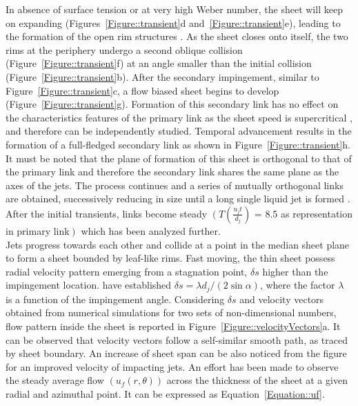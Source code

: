 \documentclass{jfm}
\begin{document}
In absence of surface tension or at very high Weber number, the sheet will keep on expanding (Figures~\ref{Figure::transient}d and~\ref{Figure::transient}e), leading to the formation of the open rim structures \citep{taylor1960formation,chen2013high}. As the sheet closes onto itself, the two rims at the periphery undergo a second oblique collision (Figure~\ref{Figure::transient}f) at an angle smaller than the initial collision (Figure~\ref{Figure::transient}b). After the secondary impingement, similar to Figure~\ref{Figure::transient}c, a flow biased sheet begins to develop (Figure~\ref{Figure::transient}g). Formation of this secondary link has no effect on the characteristics features of the primary link as the sheet speed is supercritical \citep{bush2004collision}, and therefore can be independently studied. Temporal advancement results in the formation of a full-fledged secondary link as shown in Figure~\ref{Figure::transient}h. It must be noted that the plane of formation of this sheet is orthogonal to that of the primary link and therefore the secondary link shares the same plane as the axes of the jets. The process continues and a series of mutually orthogonal links are obtained, successively reducing in size until a long single liquid jet is formed \citep{bush2004collision}. After the initial transients, links become steady $\left(T\right. \left(\frac{u_jt}{d_j}\right) $ = 8.5 as representation in primary link$\left.\right)$ which has been analyzed further. \\
Jets progress towards each other and collide at a point in the median sheet plane to form a sheet bounded by leaf-like rims. Fast moving, the thin sheet possess radial velocity pattern emerging from a stagnation point, $\delta s$ higher than the impingement location. \cite{inamura2014effect} have established $\delta s = \lambda d_j/(2\sin\alpha)$, where the factor $\lambda$ is a function of the impingement angle. Considering $\delta s$ and velocity vectors obtained from numerical simulations for two sets of non-dimensional numbers, flow pattern inside the sheet is reported in Figure~\ref{Figure::velocityVectors}a. It can be observed that velocity vectors follow a self-similar smooth path, as traced by sheet boundary. An increase of sheet span can be also noticed from the figure for an improved velocity of impacting jets.  
An effort has been made to observe the steady average flow $\left(u_f(r,\theta)\right)$ across the thickness of the sheet at a given radial and azimuthal point. It can be expressed as Equation~\ref{Equation::uf}. 
\end{document}
